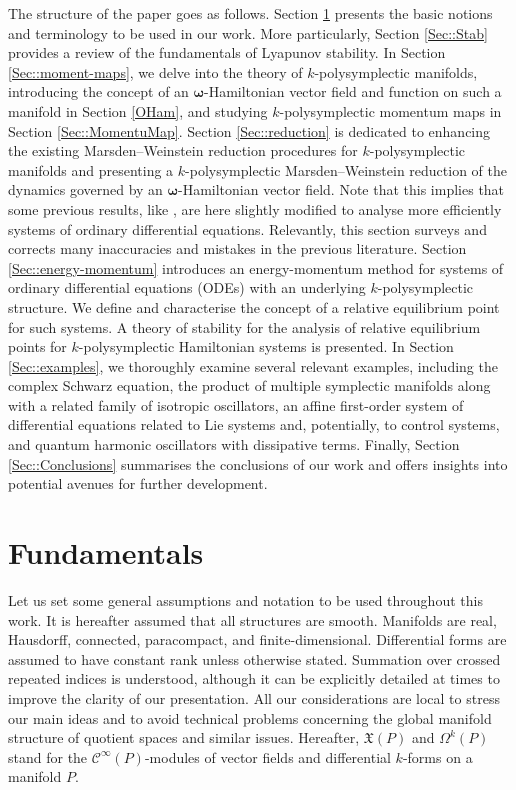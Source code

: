\documentclass[11pt]{article}
\theoremstyle{plain}
\theoremstyle{definition}
\newcommand{\Cinfty}{\mathscr{C}^\infty}
\newcommand{\bomega}{{\boldsymbol{\omega}}}
\numberwithin{equation}{section}
\begin{document}
The structure of the paper goes as follows. Section \ref{Se::Fun} presents the basic notions and terminology to be used in our work. More particularly, Section \ref{Sec::Stab} provides a review of the fundamentals of Lyapunov stability.
In Section \ref{Sec::moment-maps}, we delve into the theory of $k$-polysymplectic manifolds, introducing the concept of an $\bomega$-Hamiltonian vector field and function on such a manifold in Section \ref{OHam}, and studying $k$-polysymplectic momentum maps in Section \ref{Sec::MomentuMap}. 
Section \ref{Sec::reduction} is dedicated to enhancing the existing Marsden--Weinstein reduction procedures for $k$-polysymplectic manifolds and presenting a $k$-polysymplectic Marsden--Weinstein reduction of the dynamics governed by an $\bomega$-Hamiltonian vector field. Note that this implies that some previous results, like \cite[Theorem 4.4]{MRSV_15}, are here slightly modified to analyse more efficiently systems of ordinary differential equations. Relevantly, this section surveys and corrects many inaccuracies and mistakes in the previous literature.
Section \ref{Sec::energy-momentum} introduces an energy-momentum method for systems of ordinary differential equations (ODEs) with an underlying $k$-polysymplectic structure. We define and characterise the concept of a relative equilibrium point for such systems. A theory of stability for the analysis of relative equilibrium points for $k$-polysymplectic Hamiltonian systems is presented. 
In Section \ref{Sec::examples}, we thoroughly examine several relevant examples, including the complex Schwarz equation, the product of multiple symplectic manifolds along with a related family of isotropic oscillators, an affine first-order system of differential equations related to Lie systems and, potentially, to control systems, and  quantum harmonic oscillators with dissipative terms.
Finally, Section \ref{Sec::Conclusions} summarises the conclusions of our work and offers insights into potential avenues for further development.



\section{Fundamentals}\label{Se::Fun}

Let us set some general assumptions and notation to be used throughout this work. It is hereafter assumed that all structures are smooth. Manifolds are real, Hausdorff, connected, paracompact, and finite-dimensional. Differential forms are assumed to have constant rank unless otherwise stated. Summation over crossed repeated indices is understood, although it can be explicitly detailed at times to improve the clarity of our presentation. 
All our considerations are local to stress our main ideas and to avoid technical problems concerning the global manifold structure of quotient spaces and similar issues. Hereafter, $\mathfrak{X}(P)$ and $\Omega^k(P)$ stand for the $\Cinfty(P)$-modules of vector fields and differential $k$-forms on a manifold $P$.
\end{document}
